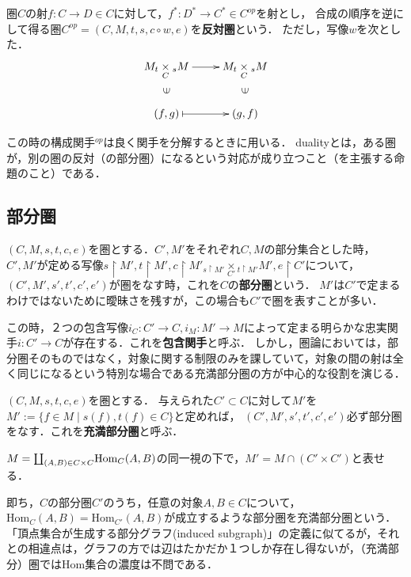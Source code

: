 \documentclass[uplatex, dvipdfmx]{jsreport}
\begin{document}
\begin{definition}
    圏$C$の射$f:C\to D\in C$に対して，$f^*:D^*\to C^*\in C^{op}$を射とし，
    合成の順序を逆にして得る圏$C^{op}=(C,M,t,s,c\circ w,e)$を\textbf{反対圏}という．
    ただし，写像$w$を次とした．
    \[\xymatrix{
        M_t\underset{C}{\times}{}_sM\ar[r]\ar@{}[d]|{\rotatebox{90}{$\in$}}&M_t\underset{C}{\times}{}_sM\ar@{}[d]|{\rotatebox{90}{$\in$}}\\
        {(f,g)}\ar@{|->}[r]&{(g,f)}
    }\]
\end{definition}

この時の構成関手${}^{op}$は良く関手を分解するときに用いる．
dualityとは，ある圏が，別の圏の反対（の部分圏）になるという対応が成り立つこと（を主張する命題のこと）である．

\subsection{部分圏}

\begin{definition}[subcategory]
    $(C,M,s,t,c,e)$を圏とする．$C',M'$をそれぞれ$C,M$の部分集合とした時，
    $C',M'$が定める写像$s\upharpoonright M', t\upharpoonright M', c\upharpoonright M'_{s\upharpoonright M'}\underset{C'}{\times}{}_{t\upharpoonright M'}M', e\upharpoonright C'$について，$(C',M',s', t', c', e')$が圏をなす時，これを$C$の\textbf{部分圏}という．
    $M'$は$C'$で定まるわけではないために曖昧さを残すが，この場合も$C'$で圏を表すことが多い．
\end{definition}

この時，２つの包含写像$i_C:C'\rightarrow C, i_M:M'\rightarrow M$によって定まる明らかな忠実関手$i:C'\rightarrow C$が存在する．これを\textbf{包含関手}と呼ぶ．
しかし，圏論においては，部分圏そのものではなく，対象に関する制限のみを課していて，対象の間の射は全く同じになるという特別な場合である充満部分圏の方が中心的な役割を演じる．

\begin{definition}
    $(C,M,s,t,c,e)$を圏とする．
    与えられた$C'\subset C$に対して$M'$を$M':=\{ f\in M \mid s(f), t(f)\in C \}$と定めれば，
    $(C',M',s',t',c',e')$必ず部分圏をなす．これを\textbf{充満部分圏}と呼ぶ．
\end{definition}
\begin{remark}
    $M=\coprod_{(A,B)\in C\times C}\Hom_C(A,B)$の同一視の下で，$M'=M\cap(C'\times C')$と表せる．
\end{remark}
即ち，$C$の部分圏$C'$のうち，任意の対象$A,B\in C$について，$\mathrm{Hom}_C(A,B)=\mathrm{Hom}_{C'}(A,B)$が成立するような部分圏を充満部分圏という．
「頂点集合が生成する部分グラフ(induced subgraph)」の定義に似てるが，それとの相違点は，グラフの方では辺はたかだか１つしか存在し得ないが，（充満部分）圏ではHom集合の濃度は不問である．
\end{document}

